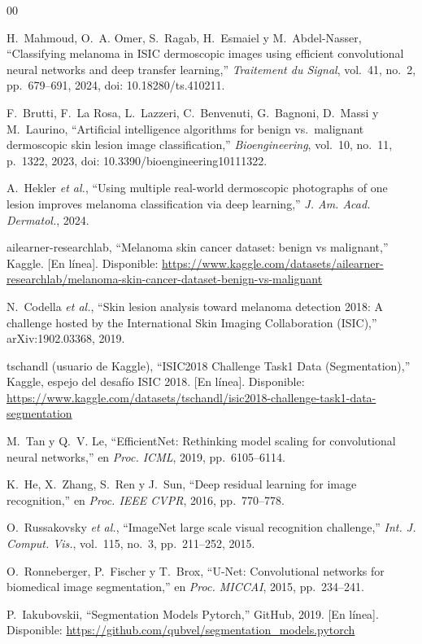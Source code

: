 \documentclass[conference]{IEEEtran}
\begin{document}
	\begin{thebibliography}{00}
		
		H.~Mahmoud, O.~A. Omer, S.~Ragab, H.~Esmaiel y M.~Abdel-Nasser, ``Classifying melanoma in ISIC dermoscopic images using efficient convolutional neural networks and deep transfer learning,'' \textit{Traitement du Signal}, vol.~41, no.~2, pp.~679--691, 2024, doi: 10.18280/ts.410211.
		
		F.~Brutti, F.~La Rosa, L.~Lazzeri, C.~Benvenuti, G.~Bagnoni, D.~Massi y M.~Laurino, ``Artificial intelligence algorithms for benign vs.\ malignant dermoscopic skin lesion image classification,'' \textit{Bioengineering}, vol.~10, no.~11, p.~1322, 2023, doi: 10.3390/bioengineering10111322.
		
		A.~Hekler \textit{et al.}, ``Using multiple real-world dermoscopic photographs of one lesion improves melanoma classification via deep learning,'' \textit{J. Am. Acad. Dermatol.}, 2024.
		
		ailearner-researchlab, ``Melanoma skin cancer dataset: benign vs malignant,'' Kaggle. [En línea]. Disponible: \url{https://www.kaggle.com/datasets/ailearner-researchlab/melanoma-skin-cancer-dataset-benign-vs-malignant}
		
		N.~Codella \textit{et al.}, ``Skin lesion analysis toward melanoma detection 2018: A challenge hosted by the International Skin Imaging Collaboration (ISIC),'' arXiv:1902.03368, 2019.
		
		tschandl (usuario de Kaggle), ``ISIC2018 Challenge Task1 Data (Segmentation),'' Kaggle, espejo del desafío ISIC 2018. [En línea]. Disponible: \url{https://www.kaggle.com/datasets/tschandl/isic2018-challenge-task1-data-segmentation}
		
		M.~Tan y Q.~V. Le, ``EfficientNet: Rethinking model scaling for convolutional neural networks,'' en \textit{Proc. ICML}, 2019, pp.~6105--6114.
		
		K.~He, X.~Zhang, S.~Ren y J.~Sun, ``Deep residual learning for image recognition,'' en \textit{Proc. IEEE CVPR}, 2016, pp.~770--778.
		
		O.~Russakovsky \textit{et al.}, ``ImageNet large scale visual recognition challenge,'' \textit{Int. J. Comput. Vis.}, vol.~115, no.~3, pp.~211--252, 2015.
		
		O.~Ronneberger, P.~Fischer y T.~Brox, ``U-Net: Convolutional networks for biomedical image segmentation,'' en \textit{Proc. MICCAI}, 2015, pp.~234--241.
		
		P.~Iakubovskii, ``Segmentation Models Pytorch,'' GitHub, 2019. [En línea]. Disponible: \url{https://github.com/qubvel/segmentation_models.pytorch}
		
	\end{thebibliography}
	
\end{document}
